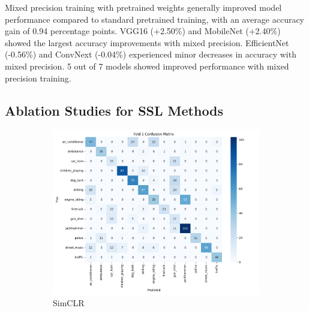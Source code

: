 \documentclass[11pt]{article}
\begin{document}
Mixed precision training with pretrained weights generally improved model performance compared to standard pretrained training, with an average accuracy gain of 0.94 percentage points. VGG16 (+2.50\%) and MobileNet (+2.40\%) showed the largest accuracy improvements with mixed precision. EfficientNet (-0.56\%) and ConvNext (-0.04\%) experienced minor decreases in accuracy with mixed precision. 5 out of 7 models showed improved performance with mixed precision training. 
\subsection{Ablation Studies for SSL Methods}
\begin{figure}[ht]
    \centering
    \begin{subfigure}[b]{0.24\textwidth}
        \centering
        \includegraphics[width=\textwidth]{latex/assets/1-fold-1-epoch/confusion_matrix_simclr.png}
        \caption{SimCLR}
        \label{fig:cm_simclr}
    \end{subfigure}
    \hfill
    \begin{subfigure}[b]{0.24\textwidth}
        \centering

\end{subfigure}
\end{figure}
\end{document}
